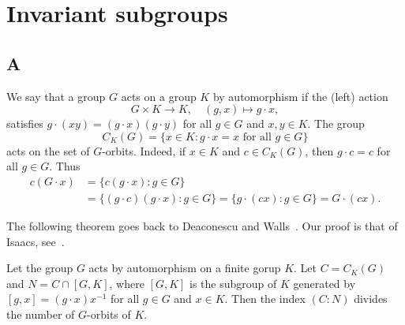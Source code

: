 \chapter{Invariant subgroups}

\section*{{{\thesection}A}}

We say that a group $G$ acts on a group $K$ by automorphism if the (left) action
\[
G\times K\to K,
\quad
(g,x)\mapsto g\cdot x,
\]
satisfies $g\cdot (xy)=(g\cdot x)(g\cdot y)$ 
for all $g\in G$ and $x,y\in K$. 
The group 
\[
C_{K}(G)=\{x\in K:g\cdot x=x\text{ for all }g\in G\}
\]
acts on the 
set of $G$-orbits. Indeed, if $x\in K$ and $c\in C_K(G)$, then $g\cdot c=c$ for all $g\in G$. Thus  
\begin{align*}
  c(G\cdot x)
  &=\{c(g\cdot x):g\in G\}\\
  &=\{(g\cdot c)(g\cdot x):g\in G\}
  =\{g\cdot (cx):g\in G\}
  =G\cdot (cx).
\end{align*}

The following theorem goes back to Deaconescu and Walls~\cite{MR2164558}. 
Our proof is that of Isaacs, see~\cite{MR2922681}. 

\begin{theorem}
	\label{thm:DeaconescuWalls}
	Let the group $G$ acts by automorphism on a finite gorup $K$. Let
	$C=C_{K}(G)$ and $N=C\cap [G,K]$,
	where $[G,K]$ is the subgroup of $K$ generated by $[g,x]=(g\cdot x)x^{-1}$ for all
	$g\in G$ and $x\in K$. Then the index $(C:N)$ divides the number of $G$-orbits of 
	$K$. 
\end{theorem}

%

